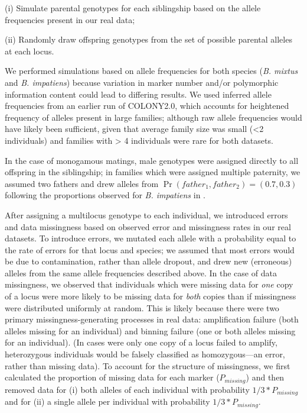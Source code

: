 \documentclass[12pt]{article}
\begin{document}
(i) Simulate parental genotypes for each siblingship based on the allele frequencies present in our real data;

(ii) Randomly draw offspring genotypes from the set of possible parental alleles at each locus.

We performed simulations based on allele frequencies for both species (\emph{B. mixtus} and \emph{B. impatiens}) because variation in marker number and/or polymorphic information content could lead to differing results. We used inferred allele frequencies from an earlier run of COLONY2.0, which accounts for heightened frequency of alleles present in large families; although raw allele frequencies would have likely been sufficient, given that average family size was small (<2 individuals) and families with > 4 individuals were rare for both datasets.

In the case of monogamous matings, male genotypes were assigned directly to all offspring in the siblingship; in families which were assigned multiple paternity, we assumed two fathers and drew alleles from $\Pr(father_1, father_2) = (0.7, 0.3)$ following the proportions observed for \emph{B. impatiens} in \textcite{birdMatingFrequencyEstimation2024}.

After assigning a multilocus genotype to each individual, we introduced errors and data missingness based on observed error and missingness rates in our real datasets. To introduce errors, we mutated each allele with a probability equal to the rate of errors for that locus and species; we assumed that most errors would be due to contamination, rather than allele dropout, and drew new (erroneous) alleles from the same allele frequencies described above. In the case of data missingness, we observed that individuals which were missing data for \emph{one} copy of a locus were more likely to be missing data for \emph{both} copies than if missingness were distributed uniformly at random. This is likely because there were two primary missingness-generating processes in real data: amplification failure (both alleles missing for an individual) and binning failure (one or both alleles missing for an individual). (In cases were only one copy of a locus failed to amplify, heterozygous individuals would be falsely classified as homozygous---an error, rather than missing data). To account for the structure of missingness, we first calculated the proportion of missing data for each marker ($P_{missing}$) and then removed data for (i) both alleles of each individual with probability $1/3 * P_{missing}$ and for (ii) a single allele per individual with probability $1/3 * P_{missing}$.
\end{document}
